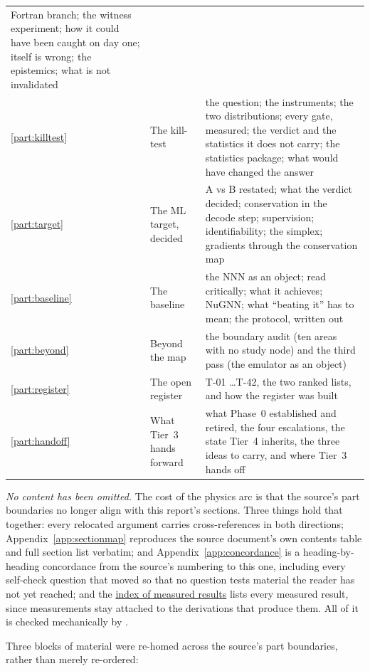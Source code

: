 \begin{center}
\begin{tabularx}{\textwidth}{@{}L{0.9cm} L{4.6cm} Y@{}}
  Fortran branch; the witness experiment; how it could have been caught on day
  one; \Ye{} itself is wrong; the epistemics; what is not invalidated \\
\ref{part:killtest} & The kill-test &
  the question; the instruments; the two distributions; every gate, measured;
  the verdict and the statistics it does not carry; the statistics package;
  what would have changed the answer \\
\ref{part:target} & The ML target, decided &
  A vs B restated; what the verdict decided; conservation in the decode step;
  \Phifl{} supervision; identifiability; the simplex; gradients through the
  conservation map \\
\ref{part:baseline} & The baseline &
  the NNN as an object; read critically; what it achieves; NuGNN; what
  ``beating it'' has to mean; the protocol, written out \\
\ref{part:beyond} & Beyond the map &
  the boundary audit (ten areas with no study node) and the third pass (the
  emulator as an object) \\
\ref{part:register} & The open register &
  T-01 \ldots T-42, the two ranked lists, and how the register was built \\
\ref{part:handoff} & What Tier~3 hands forward &
  what Phase~0 established and retired, the four escalations, the state Tier~4
  inherits, the three ideas to carry, and where Tier~3 hands off \\
\bottomrule
\end{tabularx}
\end{center}

\emph{No content has been omitted.} The cost of the physics arc is that the
source's part boundaries no longer align with this report's sections. Three
things hold that together: every relocated argument carries cross-references in
both directions; Appendix~\ref{app:sectionmap} reproduces the source document's
own contents table and full section list verbatim; and
Appendix~\ref{app:concordance} is a heading-by-heading concordance from the
source's numbering to this one, including every self-check question that moved
so that no question tests material the reader has not yet reached; and the
\hyperref[sec:resultsindex]{index of measured results} lists every measured
result, since measurements stay attached to the derivations that produce them.
All of it is checked mechanically by .

Three blocks of material were re-homed across the source's part boundaries,
rather than merely re-ordered:

